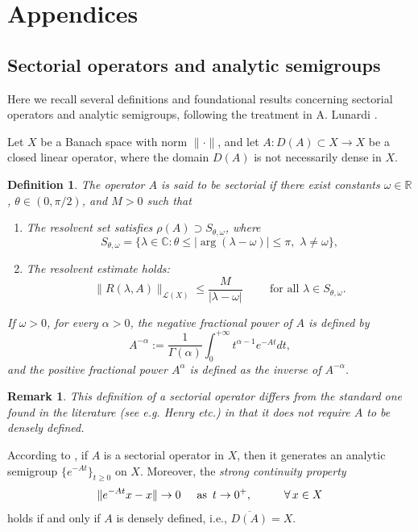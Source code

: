 \documentclass[10pt]{article}
\numberwithin{figure}{section}
\numberwithin{equation}{section}
\newtheorem{definition}[theorem]{Definition}
\newtheorem{remark}[theorem]{Remark}
\newcommand{\0}{{\theta}}
\def\br{\begin{remark}}
\def\er{\end{remark}}
\def\bd{\begin{definition}}
\def\ed{\end{definition}}
\def\0{\theta}
\def\w{\omega}
\def\a{\alpha}
\def\mb{\mbox}
\def\.{\cdot}
\def\A{\forall}
\def\ra{\rightarrow}
\def\mb{\mbox}
\def\Hs{\hspace{1cm}}\def\hs{\hspace{0.5cm}}
\begin{document}
\appendix\section*{Appendices}

\subsection{Sectorial operators and analytic semigroups}\label{App2}
Here we recall several definitions and foundational results concerning sectorial operators and analytic semigroups, following the treatment in A. Lunardi \cite{Lu}.

Let $X$ be a Banach space with norm $\|\.\|$, and let $A:D(A)\subset X\ra X$ be a closed linear operator, where the domain $D(A)$ is not necessarily dense in $X$.
\bd\label{d:4.1} The operator $A$ is said to be sectorial if there exist constants $\omega\in\mathbb{R}$, $\theta\in(0,\pi/2)$, and $M>0$ such that
\begin{enumerate}
    \item[(i)] The resolvent set satisfies $\rho(A) \supset S_{\theta, \omega}$, where
        $$
        S_{\theta, \omega} = \{ \lambda \in \mathbb{C} :\0\le|\arg(\lambda - \omega)|\le\pi,\,\, \lambda \neq \omega\},
        $$
    \item[(ii)] The resolvent estimate holds:
        $$
        \|R(\lambda, A)\|_{\mathcal{L}(X)} \leq \frac{M}{|\lambda - \omega|} \Hs \text{for all } \lambda \in S_{\theta, \omega}.
        $$
\end{enumerate} 

If $\w>0$, for every $ \alpha > 0 $, the negative fractional power of $A$ is defined by 
$$A^{-\alpha} := \frac{1}{\Gamma(\alpha)} \int_{0}^{+\infty} t^{\alpha-1} e^{-At} dt,$$
and the positive fractional power $A^\alpha$ is defined as the inverse of $A^{-\alpha}$.
\ed
\br This definition of a sectorial operator differs from the standard one found in the literature (see e.g. Henry \cite{D.H} etc.) in that it does not require $A$ to be densely defined.\er

According to \cite[Chap. 2]{Lu}, if $A$ is a sectorial operator in $X$, then it generates an analytic semigroup $\{e^{-At}\}_{t\geq 0}$ on $X$. Moreover, the {\sl strong continuity property} $$\|e^{-A  t}x-x\|\ra0 \hs \mb{as }\,t\ra0^+,\Hs \A\,x\in X$$ holds if and only if $A$ is densely defined, i.e., $\overline{D(A)}=X.$
\end{document}
